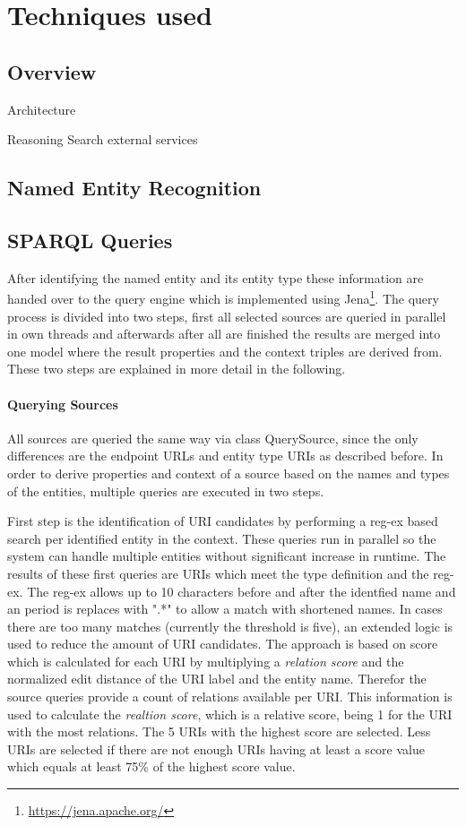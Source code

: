 \documentclass[11pt,titlepage,oneside,openany]{article}
\begin{document}
\section{Techniques used} 


\subsection{Overview}
Architecture 

Reasoning
Search
external services


\subsection{Named Entity Recognition}

\subsection{SPARQL Queries}
After identifying the named entity and its entity type these information are handed over to the query engine which is implemented using Jena\footnote{\url{https://jena.apache.org/}}. The query process is divided into two steps, first all selected sources are queried in parallel in own threads and afterwards after all are finished the results are merged into one model where the result properties and the context triples are derived from. These two steps are explained in more detail in the following.
\paragraph{Querying Sources}
All sources are queried the same way via class QuerySource, since the only differences are the endpoint URLs and entity type URIs as described before. In order to derive properties and context of a source based on the names and types of the entities, multiple queries are executed in two steps.

First step is the identification of URI candidates by performing a reg-ex based search per identified entity in the context. These queries run in parallel so the system can handle multiple entities without significant increase in runtime. The results of these first queries are URIs which meet the type definition and the reg-ex. The reg-ex allows up to 10 characters before and after the identfied name and an period is replaces with ".*" to allow a match with shortened names. In cases there are too many matches (currently the threshold is five), an extended logic is used to reduce the amount of URI candidates. 
The approach is based on score which is calculated for each URI by multiplying a \textit{relation score} and the normalized edit distance of the URI label and the entity name. Therefor the source queries provide a count of relations available per URI. This information is used to calculate the \textit{realtion score}, which is a relative score, being 1 for the URI with the most relations. The 5 URIs with the highest score are selected. Less URIs are selected if there are not enough URIs having at least a score value which equals at least 75\% of the highest score value.
\end{document}

